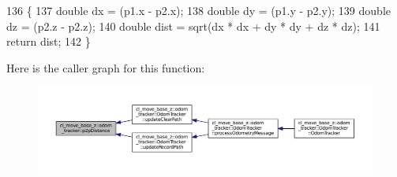 \begin{DoxyCode}
136 \{
137     \textcolor{keywordtype}{double} dx = (p1.x - p2.x);
138     \textcolor{keywordtype}{double} dy = (p1.y - p2.y);
139     \textcolor{keywordtype}{double} dz = (p2.z - p2.z);
140     \textcolor{keywordtype}{double} dist = sqrt(dx * dx + dy * dy + dz * dz);
141     \textcolor{keywordflow}{return} dist;
142 \}
\end{DoxyCode}


Here is the caller graph for this function\+:
\nopagebreak
\begin{figure}[H]
\begin{center}
\leavevmode
\includegraphics[width=350pt]{namespacecl__move__base__z_1_1odom__tracker_a501582a760a02ce0069d95bfc67ca973_icgraph}
\end{center}
\end{figure}


